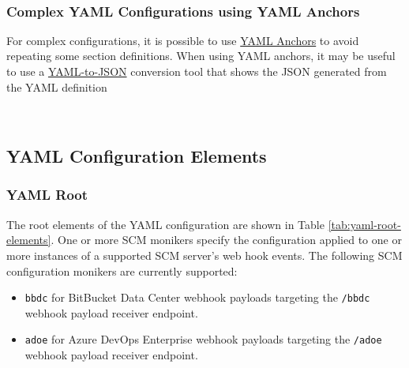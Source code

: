 

\newpage
\noindent\\


\subsubsection{Complex YAML Configurations using YAML Anchors}

For complex configurations, it is possible to use 
\href{https://docs.docker.com/compose/compose-file/10-fragments/}{YAML Anchors}
to avoid repeating some section definitions.  When using YAML anchors, it may be useful
to use a \href{https://onlineyamltools.com/convert-yaml-to-json}{YAML-to-JSON} conversion tool that shows the JSON generated from the YAML
definition

\noindent\\

\subsection{YAML Configuration Elements}

\subsubsection{YAML Root}\label{sec:yaml-root}

The root elements of the YAML configuration are shown in Table \ref{tab:yaml-root-elements}.
One or more SCM monikers specify the configuration applied to one
or more instances of a supported SCM server's web hook events.  
The following SCM configuration monikers are currently supported:

\begin{itemize}
    \item \texttt{bbdc} for BitBucket Data Center webhook payloads targeting the \texttt{/bbdc}
    webhook payload receiver endpoint.
    \item \texttt{adoe} for Azure DevOps Enterprise webhook payloads targeting the \texttt{/adoe}
    webhook payload receiver endpoint.
\end{itemize}


